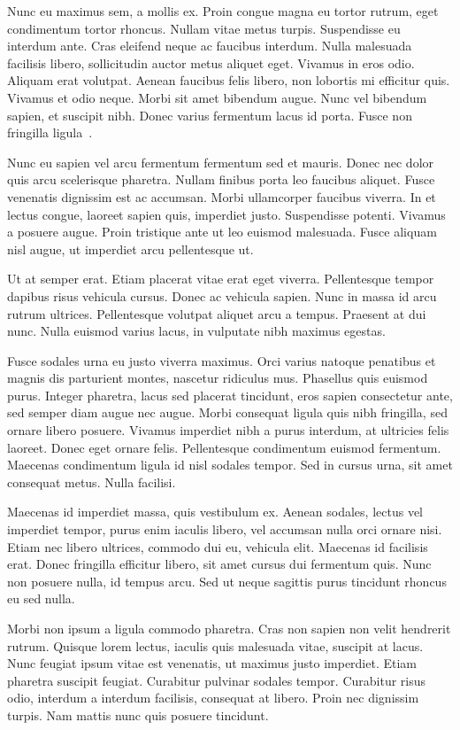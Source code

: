 \documentclass[final,5p,times,twocolumn]{elsarticle}
\begin{document}
Nunc eu maximus sem, a mollis ex. Proin congue magna eu tortor rutrum, eget condimentum tortor rhoncus. Nullam vitae metus turpis. Suspendisse eu interdum ante. Cras eleifend neque ac faucibus interdum. Nulla malesuada facilisis libero, sollicitudin auctor metus aliquet eget. Vivamus in eros odio. Aliquam erat volutpat. Aenean faucibus felis libero, non lobortis mi efficitur quis. Vivamus et odio neque. Morbi sit amet bibendum augue. Nunc vel bibendum sapien, et suscipit nibh. Donec varius fermentum lacus id porta. Fusce non fringilla ligula~\cite{Shami2022}.

Nunc eu sapien vel arcu fermentum fermentum sed et mauris. Donec nec dolor quis arcu scelerisque pharetra. Nullam finibus porta leo faucibus aliquet. Fusce venenatis dignissim est ac accumsan. Morbi ullamcorper faucibus viverra. In et lectus congue, laoreet sapien quis, imperdiet justo. Suspendisse potenti. Vivamus a posuere augue. Proin tristique ante ut leo euismod malesuada. Fusce aliquam nisl augue, ut imperdiet arcu pellentesque ut.

Ut at semper erat. Etiam placerat vitae erat eget viverra. Pellentesque tempor dapibus risus vehicula cursus. Donec ac vehicula sapien. Nunc in massa id arcu rutrum ultrices. Pellentesque volutpat aliquet arcu a tempus. Praesent at dui nunc. Nulla euismod varius lacus, in vulputate nibh maximus egestas.

Fusce sodales urna eu justo viverra maximus. Orci varius natoque penatibus et magnis dis parturient montes, nascetur ridiculus mus. Phasellus quis euismod purus. Integer pharetra, lacus sed placerat tincidunt, eros sapien consectetur ante, sed semper diam augue nec augue. Morbi consequat ligula quis nibh fringilla, sed ornare libero posuere. Vivamus imperdiet nibh a purus interdum, at ultricies felis laoreet. Donec eget ornare felis. Pellentesque condimentum euismod fermentum. Maecenas condimentum ligula id nisl sodales tempor. Sed in cursus urna, sit amet consequat metus. Nulla facilisi.

Maecenas id imperdiet massa, quis vestibulum ex. Aenean sodales, lectus vel imperdiet tempor, purus enim iaculis libero, vel accumsan nulla orci ornare nisi. Etiam nec libero ultrices, commodo dui eu, vehicula elit. Maecenas id facilisis erat. Donec fringilla efficitur libero, sit amet cursus dui fermentum quis. Nunc non posuere nulla, id tempus arcu. Sed ut neque sagittis purus tincidunt rhoncus eu sed nulla.

Morbi non ipsum a ligula commodo pharetra. Cras non sapien non velit hendrerit rutrum. Quisque lorem lectus, iaculis quis malesuada vitae, suscipit at lacus. Nunc feugiat ipsum vitae est venenatis, ut maximus justo imperdiet. Etiam pharetra suscipit feugiat. Curabitur pulvinar sodales tempor. Curabitur risus odio, interdum a interdum facilisis, consequat at libero. Proin nec dignissim turpis. Nam mattis nunc quis posuere tincidunt.
\end{document}
